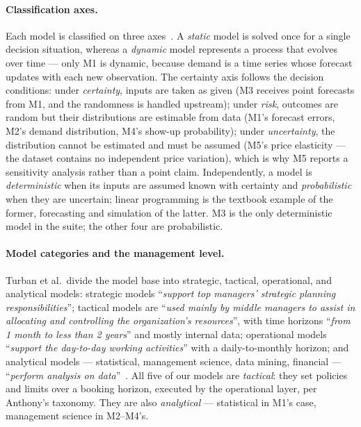 \paragraph{Classification axes.}
Each model is classified on three axes~\cite{turban2011}. A \emph{static} model is solved once for a single decision situation, whereas a \emph{dynamic} model represents a process that evolves over time --- only M1 is dynamic, because demand is a time series whose forecast updates with each new observation. The certainty axis follows the decision conditions: under \emph{certainty}, inputs are taken as given (M3 receives point forecasts from M1, and the randomness is handled upstream); under \emph{risk}, outcomes are random but their distributions are estimable from data (M1's forecast errors, M2's demand distribution, M4's show-up probability); under \emph{uncertainty}, the distribution cannot be estimated and must be assumed (M5's price elasticity --- the dataset contains no independent price variation), which is why M5 reports a sensitivity analysis rather than a point claim. Independently, a model is \emph{deterministic} when its inputs are assumed known with certainty and \emph{probabilistic} when they are uncertain; linear programming is the textbook example of the former, forecasting and simulation of the latter. M3 is the only deterministic model in the suite; the other four are probabilistic.

\paragraph{Model categories and the management level.}
Turban et al.\ divide the model base into strategic, tactical, operational, and analytical models: strategic models ``\emph{support top managers' strategic planning responsibilities}''; tactical models are ``\emph{used mainly by middle managers to assist in allocating and controlling the organization's resources}'', with time horizons ``\emph{from 1 month to less than 2 years}'' and mostly internal data; operational models ``\emph{support the day-to-day working activities}'' with a daily-to-monthly horizon; and analytical models --- statistical, management science, data mining, financial --- ``\emph{perform analysis on data}''~\cite{turban2011}. All five of our models are \emph{tactical}: they set policies and limits over a booking horizon, executed by the operational layer, per Anthony's taxonomy. They are also \emph{analytical} --- statistical in M1's case, management science in M2--M4's.

